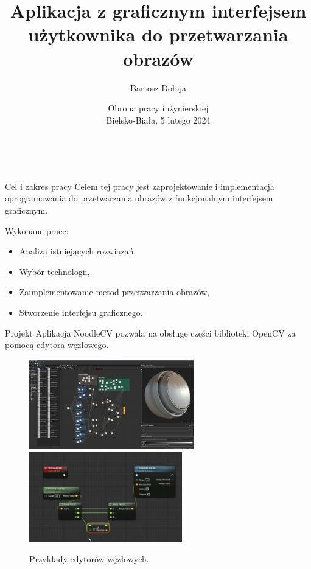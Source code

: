 \documentclass[aspectratio=1610,handout]{beamer}
\title{Aplikacja z graficznym interfejsem użytkownika do przetwarzania obrazów}
\author[Bartosz Dobija]{Bartosz Dobija}
\institute{Uniwersytet Bielsko-Bialski\\ Wydział Budowy Maszyn i Informatyki}
\date[5 lutego 2024]{Obrona pracy inżynierskiej \\ Bielsko-Biała, 5 lutego 2024}
\theoremstyle{definition}
\begin{document}
\begin{frame}{$ $}
    \titlepage
\end{frame}

\begin{frame}{Cel i zakres pracy}
    Celem tej pracy jest zaprojektowanie i implementacja oprogramowania do przetwarzania obrazów z funkcjonalnym interfejsem graficznym.
    \vspace{1cm}

    Wykonane prace:
    \begin{itemize}
        \item Analiza istniejących rozwiązań,
        \item Wybór technologii,
        \item Zaimplementowanie metod przetwarzania obrazów,
        \item Stworzenie interfejsu graficznego.
    \end{itemize}
\end{frame}

\begin{frame}{Projekt}
    Aplikacja NoodleCV pozwala na obsługę części biblioteki OpenCV za pomocą edytora węzłowego.

    \begin{figure}
            \includegraphics[height=3.9cm]{./imgs/substance.jpg}%
            \hfil
            \includegraphics[height=3.9cm]{./imgs/unreal.JPG}
            \caption{Przykłady edytorów węzłowych.}
    \end{figure}

\end{frame}
\end{document}
